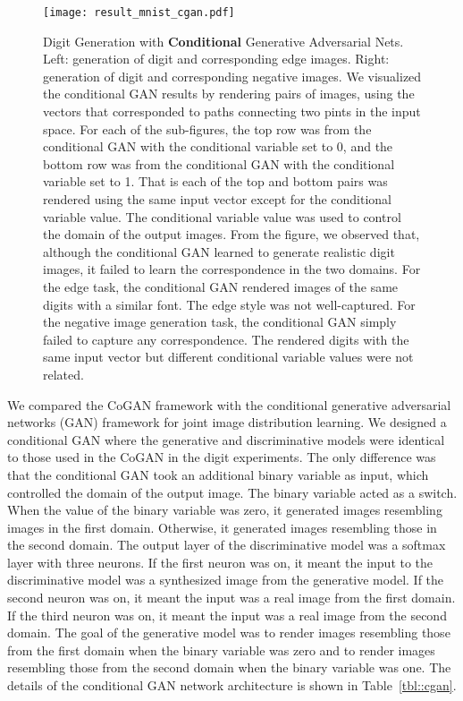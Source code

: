 \documentclass{article}
\begin{document}
\begin{figure}[thb!]
\centering
\texttt{[image: result\_mnist\_cgan.pdf]}
\caption{Digit Generation with {\bf Conditional} Generative Adversarial Nets. Left:  generation of digit and corresponding edge images. Right: generation of digit and corresponding negative images. We visualized the conditional GAN results by rendering pairs of images, using the vectors that corresponded to paths connecting two pints in the input space. For each of the sub-figures, the top row was from the conditional GAN with the conditional variable set to 0, and the bottom row was from the conditional GAN with the conditional variable set to 1. That is each of the top and bottom pairs was rendered using the same input vector except for the conditional variable value. The conditional variable value was used to control the domain of the output images. From the figure, we observed that, although the conditional GAN learned to generate realistic digit images, it failed to learn the correspondence in the two domains. For the edge task, the conditional GAN rendered images of the same digits with a similar font. The edge style was not well-captured. For the negative image generation task, the conditional GAN simply failed to capture any correspondence. The rendered digits with the same input vector but different conditional variable values were not related. 
}
\label{fig::result_mnist_cgan_vis}
\end{figure}

We compared the CoGAN framework with the conditional generative adversarial networks (GAN) framework for joint image distribution learning. We designed a conditional GAN where the generative and discriminative models were identical to those used in the CoGAN in the digit experiments. The only difference was that the conditional GAN took an additional binary variable as input, which controlled the domain of the output image. The binary variable acted as a switch. When the value of the binary variable was zero, it generated images resembling images in the first domain. Otherwise, it generated images resembling those in the second domain. The output layer of the discriminative model was a softmax layer with three neurons. If the first neuron was on, it meant the input to the discriminative model was a synthesized image from the generative model. If the second neuron was on, it meant the input was a real image from the first domain. If the third neuron was on, it meant the input was a real image from the second domain. The goal of the generative model was to render images resembling those from the first domain when the binary variable was zero and to render images resembling those from the second domain when the binary variable was one. The details of the conditional GAN network architecture is shown in Table~\ref{tbl::cgan}.
\end{document}
